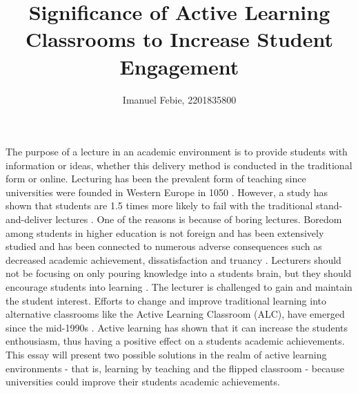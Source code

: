 \documentclass[12pt]{article}
\begin{document}
\title{Significance of Active Learning Classrooms to Increase Student Engagement}
\author{Imanuel Febie, 2201835800}
\maketitle

The purpose of a lecture in an academic environment is to provide students with information or ideas, whether this delivery method is conducted in the traditional form or online. Lecturing has been the prevalent form of teaching since universities were founded in Western Europe in 1050 \cite{bajak2014lectures}. However, a study has shown that students are 1.5 times more likely to fail with the traditional stand-and-deliver lectures \cite{freeman-active-learning-2014}. One of the reasons is because of boring lectures. Boredom among students in higher education is not foreign and has been extensively studied and has been connected to numerous adverse consequences such as decreased academic achievement, dissatisfaction and truancy \cite{boredom-among-students}. Lecturers should not be focusing on only pouring knowledge into a students brain, but they should encourage students into learning \cite{satisfaction-active-learning}. The lecturer is challenged to gain and maintain the student interest. Efforts to change and improve traditional learning into alternative classrooms like the Active Learning Classroom (ALC), have emerged since the mid-1990s \cite{guide-to-teaching-alc}. Active learning has shown that it can increase the students enthousiasm, thus having a positive effect on a students academic achievements. This essay will present two possible solutions in the realm of active learning environments - that is, learning by teaching and the flipped classroom - because universities could improve their students academic achievements.
\end{document}
